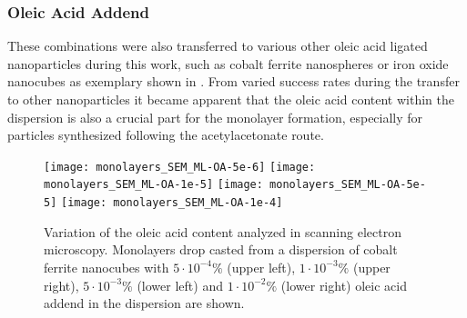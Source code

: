 \documentclass[\main/dresen_thesis.tex]{subfiles}
\begin{document}
  \subsubsection{Oleic Acid Addend}
    These combinations were also transferred to various other oleic acid ligated nanoparticles during this work, such as cobalt ferrite nanospheres or iron oxide nanocubes as exemplary shown in .
    From varied success rates during the transfer to other nanoparticles it became apparent that the oleic acid content within the dispersion is also a crucial part for the monolayer formation, especially for particles synthesized following the acetylacetonate route.

    \begin{figure}[tb]
      \centering
      \texttt{[image: monolayers\_SEM\_ML-OA-5e-6]}
      \texttt{[image: monolayers\_SEM\_ML-OA-1e-5]}
      \texttt{[image: monolayers\_SEM\_ML-OA-5e-5]}
      \texttt{[image: monolayers\_SEM\_ML-OA-1e-4]}
      \caption{\label{fig:monolayers:preparation:solventVariation:OAAddend}Variation of the oleic acid content analyzed in scanning electron microscopy. Monolayers drop casted from a dispersion of cobalt ferrite nanocubes with $5\cdot10^{-4} \unit{\%}$ (upper left), $1\cdot10^{-3} \unit{\%}$ (upper right), $5\cdot10^{-3} \unit{\%}$ (lower left) and $1\cdot10^{-2} \unit{\%}$ (lower right) oleic acid addend in the dispersion are shown.}
    \end{figure}
\end{document}
